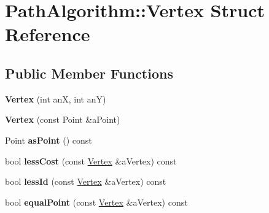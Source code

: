 \hypertarget{struct_path_algorithm_1_1_vertex}{}\section{Path\+Algorithm\+:\+:Vertex Struct Reference}
\label{struct_path_algorithm_1_1_vertex}
\subsection*{Public Member Functions}
\begin{DoxyCompactItemize}
\item 
{\bfseries Vertex} (int anX, int anY)\hypertarget{struct_path_algorithm_1_1_vertex_a6a84a2bea6bf4728fb66b0ca6ed80966}{}\label{struct_path_algorithm_1_1_vertex_a6a84a2bea6bf4728fb66b0ca6ed80966}

\item 
{\bfseries Vertex} (const Point \&a\+Point)\hypertarget{struct_path_algorithm_1_1_vertex_ae471ae74a4bf26951391741d2f58d6b2}{}\label{struct_path_algorithm_1_1_vertex_ae471ae74a4bf26951391741d2f58d6b2}

\item 
Point {\bfseries as\+Point} () const \hypertarget{struct_path_algorithm_1_1_vertex_a226fcb1a96402593bf0ce3bfede2157a}{}\label{struct_path_algorithm_1_1_vertex_a226fcb1a96402593bf0ce3bfede2157a}

\item 
bool {\bfseries less\+Cost} (const \hyperlink{struct_path_algorithm_1_1_vertex}{Vertex} \&a\+Vertex) const \hypertarget{struct_path_algorithm_1_1_vertex_afe13add443706b4fb534fbc0af5b0bfc}{}\label{struct_path_algorithm_1_1_vertex_afe13add443706b4fb534fbc0af5b0bfc}

\item 
bool {\bfseries less\+Id} (const \hyperlink{struct_path_algorithm_1_1_vertex}{Vertex} \&a\+Vertex) const \hypertarget{struct_path_algorithm_1_1_vertex_aea5063979800ccbd795fed9f33cbb483}{}\label{struct_path_algorithm_1_1_vertex_aea5063979800ccbd795fed9f33cbb483}

\item 
bool {\bfseries equal\+Point} (const \hyperlink{struct_path_algorithm_1_1_vertex}{Vertex} \&a\+Vertex) const \hypertarget{struct_path_algorithm_1_1_vertex_a64aa2913bc0e1d1511a452c5d800803a}{}\label{struct_path_algorithm_1_1_vertex_a64aa2913bc0e1d1511a452c5d800803a}

\end{DoxyCompactItemize}

